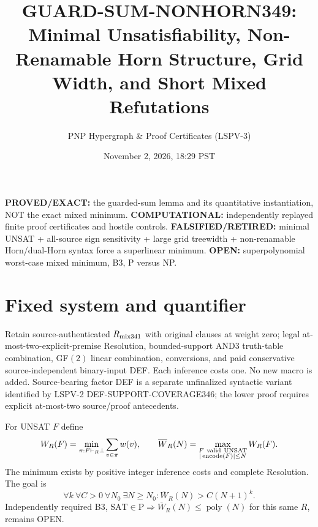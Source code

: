 \documentclass[11pt]{article}
\title{GUARD-SUM-NONHORN349: Minimal Unsatisfiability, Non-Renamable Horn Structure, Grid Width, and Short Mixed Refutations}
\author{PNP Hypergraph \& Proof Certificates (LSPV-3)}
\date{November 2, 2026, 18:29 PST}
\begin{document}
\maketitle

\noindent\textbf{PROVED/EXACT:} the guarded-sum lemma and its quantitative instantiation, NOT the exact mixed minimum.
\textbf{COMPUTATIONAL:} independently replayed finite proof certificates and hostile controls.
\textbf{FALSIFIED/RETIRED:} minimal UNSAT + all-source sign sensitivity + large grid treewidth + non-renamable Horn/dual-Horn syntax force a superlinear minimum.
\textbf{OPEN:} superpolynomial worst-case mixed minimum, B3, P versus NP.

\section*{Fixed system and quantifier}
Retain source-authenticated $R_{\rm mix341}$ with original clauses at weight zero; legal at-most-two-explicit-premise Resolution, bounded-support AND3 truth-table combination, GF$(2)$ linear combination, conversions, and paid conservative source-independent binary-input DEF. Each inference costs one. No new macro is added. Source-bearing factor DEF is a separate unfinalized syntactic variant identified by LSPV-2 DEF-SUPPORT-COVERAGE346; the lower proof requires explicit at-most-two source/proof antecedents.

For UNSAT $F$ define
\[
W_R(F)=\min_{\pi:F\vdash_R\bot}\sum_{v\in\pi} w(v),\qquad
\overline W_R(N)=\max_{\substack{F\ {\rm valid\ UNSAT}\\|\operatorname{encode}(F)|\le N}}W_R(F).
\]
The minimum exists by positive integer inference costs and complete Resolution. The goal is
\[
\forall k\ \forall C>0\ \forall N_0\ \exists N\ge N_0:
\overline W_R(N)>C(N+1)^k.
\]
Independently required B3, $\mathrm{SAT}\in\mathrm P\Rightarrow\overline W_R(N)\le\operatorname{poly}(N)$ for this same $R$, remains OPEN.
\end{document}
